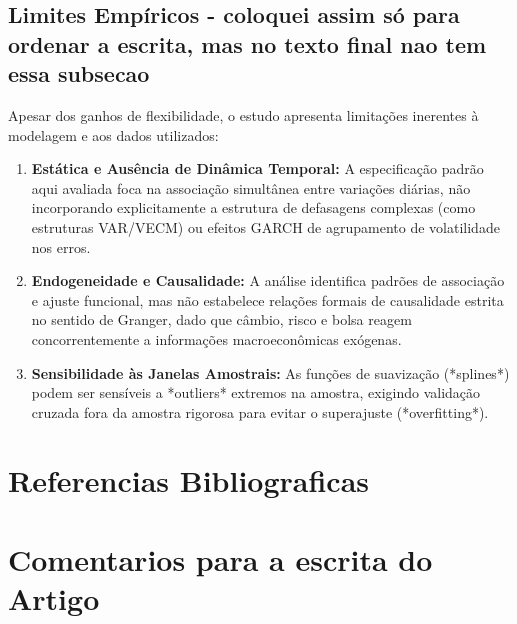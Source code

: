\documentclass[11pt,a4paper]{article}
\begin{document}
\subsection{Limites Empíricos - coloquei assim só para ordenar a escrita, mas no texto final nao tem essa subsecao}
Apesar dos ganhos de flexibilidade, o estudo apresenta limitações inerentes à modelagem e aos dados utilizados:
\begin{enumerate}
    \item \textbf{Estática e Ausência de Dinâmica Temporal:} A especificação padrão aqui avaliada foca na associação simultânea entre variações diárias, não incorporando explicitamente a estrutura de defasagens complexas (como estruturas VAR/VECM) ou efeitos GARCH de agrupamento de volatilidade nos erros.
    \item \textbf{Endogeneidade e Causalidade:} A análise identifica padrões de associação e ajuste funcional, mas não estabelece relações formais de causalidade estrita no sentido de Granger, dado que câmbio, risco e bolsa reagem concorrentemente a informações macroeconômicas exógenas.
    \item \textbf{Sensibilidade às Janelas Amostrais:} As funções de suavização (*splines*) podem ser sensíveis a *outliers* extremos na amostra, exigindo validação cruzada fora da amostra rigorosa para evitar o superajuste (*overfitting*).
\end{enumerate}

\section{Referencias Bibliograficas}


\section{Comentarios para a escrita do Artigo}
\end{document}
